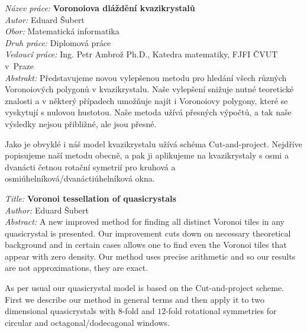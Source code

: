 \documentclass[a4paper,10pt,twoside]{report}
\theoremstyle{remark}
\begin{document}
{
\setlength{\parindent}{0pt}

\textit{Název práce:}
\textbf{Voronoiova dláždění kvazikrystalů} \\

\textit{Autor:} Eduard Šubert \\

\textit{Obor:} Matematická informatika \\

\textit{Druh práce:} Diplomová práce \\

\textit{Vedoucí práce:}  Ing. Petr Ambrož Ph.D., Katedra matematiky, FJFI ČVUT v~Praze \\

\textit{Abstrakt:} 
Představujeme novou vylepšenou metodu pro hledání všech různých Voronoiových polygonů v kvazikrystalu. Naše vylepšení snižuje nutné teoretické znalosti a v některý případech umožňuje najít i Voronoiovy polygony, které se vyskytují s nulovou hustotou. Naše metoda užívá přesných výpočtů, a tak naše výsledky nejsou přibližné, ale jsou přesné. 

Jako je obvyklé i náš model kvazikrystalu užívá schéma Cut-and-project. Nejdříve popisujeme naší metodu obecně, a pak ji aplikujeme na kvazikrystaly s osmi a dvanácti četnou rotační symetrií pro kruhová a osmiúhelníková/dvanáctiúhelníková okna. 

\vspace{1.5cm}

\textit{Title:}
\textbf{Voronoi tessellation of quasicrystals} \\

\textit{Author:} Eduard Šubert\\

\textit{Abstract:} 
A new improved method for finding all distinct Voronoi tiles in any quasicrystal is presented. Our improvement cuts down on necessary theoretical background and in certain cases allows one to find even the Voronoi tiles that appear with zero density. Our method uses precise arithmetic and so our results are not approximations, they are exact. 

As per usual our quasicrystal model is based on the Cut-and-project scheme. First we describe our method in general terms and then apply it to two dimensional quasicrystals with $8$-fold and $12$-fold rotational symmetries for circular and octagonal/dodecagonal windows. 


}

\end{document}
